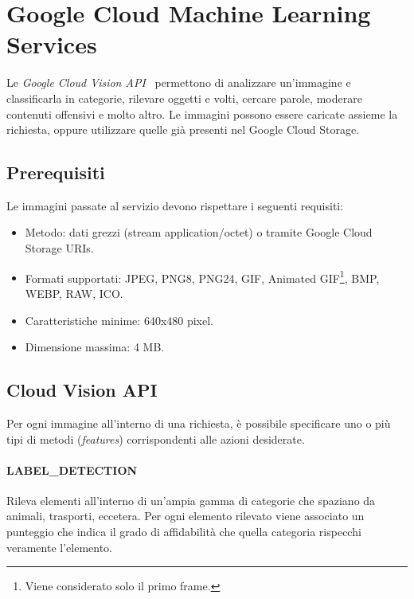 %
\section{Google Cloud Machine Learning Services}
Le \textit{Google Cloud Vision API}~\cite{google-api} permettono di analizzare un'immagine e classificarla in categorie, rilevare oggetti e volti, cercare parole,
moderare contenuti offensivi e molto altro. Le immagini possono essere caricate assieme la richiesta, oppure utilizzare quelle già presenti nel Google Cloud Storage.
%
\subsection{Prerequisiti}
Le immagini passate al servizio devono rispettare i seguenti requisiti:
\begin{itemize}
\item Metodo: dati grezzi (stream application/octet) o tramite Google Cloud Storage URIs.
\item Formati supportati: JPEG, PNG8, PNG24, GIF, Animated GIF\footnote{Viene considerato solo il primo frame.},
BMP, WEBP, RAW, ICO.
\item Caratteristiche minime: 640x480 pixel.
\item Dimensione massima: 4 MB.
\end{itemize}
\subsection{Cloud Vision API}
Per ogni immagine all'interno di una richiesta, è possibile specificare uno o più tipi di metodi (\textit{features}) corrispondenti alle azioni desiderate.
\paragraph{\textsf{LABEL\_DETECTION}} Rileva elementi all'interno di un'ampia gamma di categorie che spaziano da animali, trasporti, eccetera.
Per ogni elemento rilevato viene associato un punteggio che indica il grado di affidabilità che quella categoria rispecchi veramente l'elemento.
%
